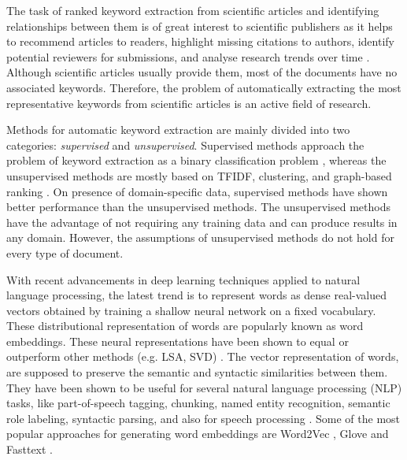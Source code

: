 \documentclass[11pt,a4paper]{article}
\begin{document}
The task of ranked keyword extraction from scientific articles and identifying relationships between them is of great interest to scientific publishers as it helps to recommend articles to readers, highlight
missing citations to authors, identify potential reviewers for submissions, and analyse research trends over time \cite{augenstein2017semeval}. Although scientific articles usually provide them, most of the documents have no associated keywords. Therefore, the problem of automatically extracting the most representative keywords from scientific articles is an active field of research. 

Methods for automatic keyword extraction are mainly divided into two categories: \textit{supervised} and \textit{unsupervised}. 
Supervised methods approach the problem of keyword extraction as a binary classification problem \cite{hasan2014automatic}, whereas the unsupervised methods are mostly based on TFIDF, clustering, and graph-based ranking \cite{hasan2010conundrums}. On presence of domain-specific data, supervised methods have shown better performance than the unsupervised methods. The unsupervised methods have the advantage of not requiring any training data and can produce results in any domain. However, the assumptions of unsupervised methods do not hold for every type of document. 

With recent advancements in deep learning techniques applied to natural language processing, the latest trend is to represent words as dense real-valued vectors obtained by training a shallow neural network on a fixed vocabulary. These distributional representation of words are popularly known as word embeddings. These neural representations have been shown to equal or outperform other methods (e.g. LSA, SVD) \cite{baroni2014don}. The vector representation of words, are supposed to preserve the semantic and syntactic similarities between them. They have been shown to be useful for several natural language processing (NLP) tasks, like part-of-speech tagging, chunking, named entity recognition, semantic role labeling, syntactic parsing, and also for speech processing \cite{collobert2011natural}. Some of the most popular approaches for generating word embeddings are Word2Vec \cite{mikolov2013distributed}, Glove \cite{pennington2014glove} and Fasttext \cite{bojanowski2016enriching}.
\end{document}

